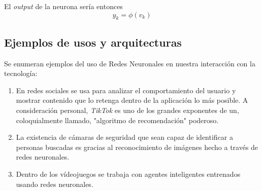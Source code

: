 \documentclass[14pt,a4paper]{report}
\begin{document}
El \textit{output} de la neurona sería entonces $$y_{k}=\phi(v_{k})$$

\subsection*{Ejemplos de usos y arquitecturas}
Se enumeran ejemplos del uso de Redes Neuronales en nuestra interacción con la tecnología:
\begin{enumerate}


\item En redes sociales se usa para analizar el comportamiento del usuario y mostrar contenido que lo retenga dentro de la aplicación lo más posible. A consideración personal, \textit{TikTok} es uno de los grandes exponentes de un, coloquialmente llamado, "algoritmo de recomendación" poderoso.
\item La existencia de cámaras de seguridad que sean capaz de identificar a personas buscadas es gracias al reconocimiento de imágenes hecho a través de redes neuronales.
\item Dentro de los vídeojuegos se trabaja con agentes inteligentes entrenados usando redes neuronales.
\end{enumerate}
\end{document}
